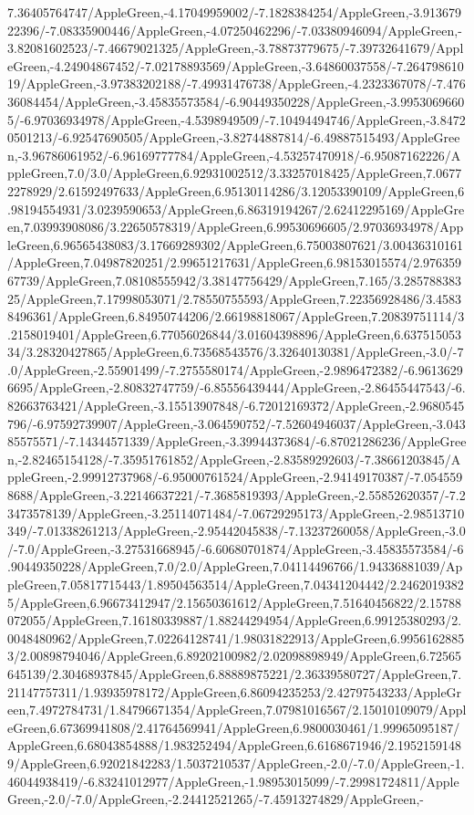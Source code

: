 {\begin{tikzternal}
7.36405764747/AppleGreen,-4.17049959002/-7.1828384254/AppleGreen,-3.91367922396/-7.08335900446/AppleGreen,-4.07250462296/-7.03380946094/AppleGreen,-3.82081602523/-7.46679021325/AppleGreen,-3.78873779675/-7.39732641679/AppleGreen,-4.24904867452/-7.02178893569/AppleGreen,-3.64860037558/-7.26479861019/AppleGreen,-3.97383202188/-7.49931476738/AppleGreen,-4.2323367078/-7.47636084454/AppleGreen,-3.45835573584/-6.90449350228/AppleGreen,-3.99530696605/-6.97036934978/AppleGreen,-4.5398949509/-7.10494494746/AppleGreen,-3.84720501213/-6.92547690505/AppleGreen,-3.82744887814/-6.49887515493/AppleGreen,-3.96786061952/-6.96169777784/AppleGreen,-4.53257470918/-6.95087162226/AppleGreen,7.0/3.0/AppleGreen,6.92931002512/3.33257018425/AppleGreen,7.06772278929/2.61592497633/AppleGreen,6.95130114286/3.12053390109/AppleGreen,6.98194554931/3.0239590653/AppleGreen,6.86319194267/2.62412295169/AppleGreen,7.03993908086/3.22650578319/AppleGreen,6.99530696605/2.97036934978/AppleGreen,6.96565438083/3.17669289302/AppleGreen,6.75003807621/3.00436310161/AppleGreen,7.04987820251/2.99651217631/AppleGreen,6.98153015574/2.97635967739/AppleGreen,7.08108555942/3.38147756429/AppleGreen,7.165/3.28578838325/AppleGreen,7.17998053071/2.78550755593/AppleGreen,7.22356928486/3.45838496361/AppleGreen,6.84950744206/2.66198818067/AppleGreen,7.20839751114/3.2158019401/AppleGreen,6.77056026844/3.01604398896/AppleGreen,6.63751505334/3.28320427865/AppleGreen,6.73568543576/3.32640130381/AppleGreen,-3.0/-7.0/AppleGreen,-2.55901499/-7.2755580174/AppleGreen,-2.9896472382/-6.96136296695/AppleGreen,-2.80832747759/-6.85556439444/AppleGreen,-2.86455447543/-6.82663763421/AppleGreen,-3.15513907848/-6.72012169372/AppleGreen,-2.9680545796/-6.97592739907/AppleGreen,-3.064590752/-7.52604946037/AppleGreen,-3.04385575571/-7.14344571339/AppleGreen,-3.39944373684/-6.87021286236/AppleGreen,-2.82465154128/-7.35951761852/AppleGreen,-2.83589292603/-7.38661203845/AppleGreen,-2.99912737968/-6.95000761524/AppleGreen,-2.94149170387/-7.0545598688/AppleGreen,-3.22146637221/-7.3685819393/AppleGreen,-2.55852620357/-7.23473578139/AppleGreen,-3.25114071484/-7.06729295173/AppleGreen,-2.98513710349/-7.01338261213/AppleGreen,-2.95442045838/-7.13237260058/AppleGreen,-3.0/-7.0/AppleGreen,-3.27531668945/-6.60680701874/AppleGreen,-3.45835573584/-6.90449350228/AppleGreen,7.0/2.0/AppleGreen,7.04114496766/1.94336881039/AppleGreen,7.05817715443/1.89504563514/AppleGreen,7.04341204442/2.24620193825/AppleGreen,6.96673412947/2.15650361612/AppleGreen,7.51640456822/2.15788072055/AppleGreen,7.16180339887/1.88244294954/AppleGreen,6.99125380293/2.0048480962/AppleGreen,7.02264128741/1.98031822913/AppleGreen,6.99561628853/2.00898794046/AppleGreen,6.89202100982/2.02098898949/AppleGreen,6.72565645139/2.30468937845/AppleGreen,6.88889875221/2.36339580727/AppleGreen,7.21147757311/1.93935978172/AppleGreen,6.86094235253/2.42797543233/AppleGreen,7.4972784731/1.84796671354/AppleGreen,7.07981016567/2.15010109079/AppleGreen,6.67369941808/2.41764569941/AppleGreen,6.9800030461/1.99965095187/AppleGreen,6.68043854888/1.983252494/AppleGreen,6.6168671946/2.19521591489/AppleGreen,6.92021842283/1.5037210537/AppleGreen,-2.0/-7.0/AppleGreen,-1.46044938419/-6.83241012977/AppleGreen,-1.98953015099/-7.29981724811/AppleGreen,-2.0/-7.0/AppleGreen,-2.24412521265/-7.45913274829/AppleGreen,-
\end{tikzternal}}
